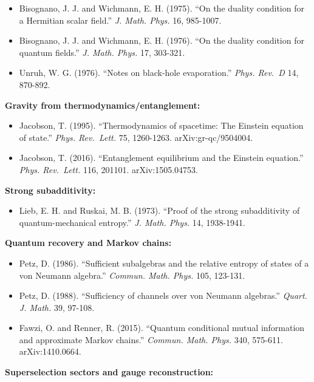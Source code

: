 \documentclass[11pt,a4paper]{article}
\theoremstyle{remark}
\providecommand{\tightlist}{%
  \setlength{\itemsep}{0pt}\setlength{\parskip}{0pt}}
\begin{document}
\begin{itemize}
\tightlist
\item
  Bisognano, J. J. and Wichmann, E. H. (1975). ``On the duality condition for
  a Hermitian scalar field.'' \emph{J. Math. Phys.} 16, 985-1007.
\item
  Bisognano, J. J. and Wichmann, E. H. (1976). ``On the duality condition for
  quantum fields.'' \emph{J. Math. Phys.} 17, 303-321.
\item
  Unruh, W. G. (1976). ``Notes on black-hole evaporation.'' \emph{Phys. Rev.~D} 14,
  870-892.
\end{itemize}

\textbf{Gravity from thermodynamics/entanglement:}

\begin{itemize}
\tightlist
\item
  Jacobson, T. (1995). ``Thermodynamics of spacetime: The Einstein equation of
  state.'' \emph{Phys. Rev.~Lett.} 75, 1260-1263. arXiv:gr-qc/9504004.
\item
  Jacobson, T. (2016). ``Entanglement equilibrium and the Einstein equation.''
  \emph{Phys. Rev.~Lett.} 116, 201101. arXiv:1505.04753.
\end{itemize}

\textbf{Strong subadditivity:}

\begin{itemize}
\tightlist
\item
  Lieb, E. H. and Ruskai, M. B. (1973). ``Proof of the strong subadditivity of
  quantum-mechanical entropy.'' \emph{J. Math. Phys.} 14, 1938-1941.
\end{itemize}

\textbf{Quantum recovery and Markov chains:}

\begin{itemize}
\tightlist
\item
  Petz, D. (1986). ``Sufficient subalgebras and the relative entropy of states
  of a von Neumann algebra.'' \emph{Commun. Math. Phys.} 105, 123-131.
\item
  Petz, D. (1988). ``Sufficiency of channels over von Neumann algebras.''
  \emph{Quart. J. Math.} 39, 97-108.
\item
  Fawzi, O. and Renner, R. (2015). ``Quantum conditional mutual information
  and approximate Markov chains.'' \emph{Commun. Math. Phys.} 340, 575-611.
  arXiv:1410.0664.
\end{itemize}

\textbf{Superselection sectors and gauge reconstruction:}
\end{document}

